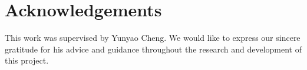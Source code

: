\section*{Acknowledgements}
This work was supervised by Yunyao Cheng.
We would like to express our sincere gratitude for his advice and guidance throughout the research and development of this project.